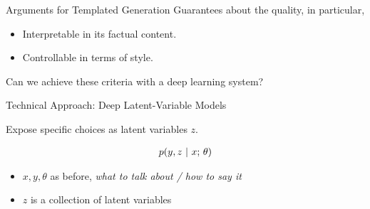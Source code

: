 







\begin{frame}{Arguments for Templated Generation}
Guarantees about the quality, in particular,
\air


\begin{itemize}
\item Interpretable in its factual content.
  \air


  \air

\item Controllable in terms of style.
  \air



\end{itemize}

\begin{center}
  Can we achieve these criteria with a deep learning system?
\end{center}
\end{frame}


\begin{frame}{Technical Approach: Deep Latent-Variable Models}

  Expose specific choices as latent variables $z$.


\begin{align*}
p(y, z\ |\ x ; \, \theta)
\end{align*}

\begin{itemize}
    \item $x, y, \theta$ as before, \textit{what to talk about / how to say it}
    \item $z$ is a collection of latent variables
\end{itemize}



\end{frame}

